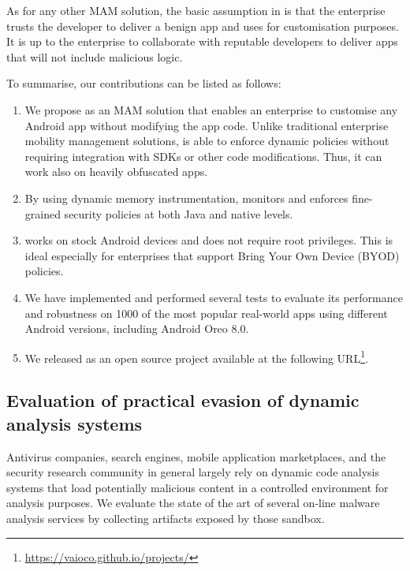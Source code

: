As for any other MAM solution, the basic assumption in \asd is that the enterprise trusts the developer to deliver a benign app and uses \asd for customisation purposes. It is up to the enterprise to collaborate with reputable developers to deliver apps that will not include malicious logic. 

To summarise, our contributions can be listed as follows: 

\begin{enumerate}
\item We propose \asd as an MAM solution that enables an enterprise to customise any Android app without modifying the app code. Unlike traditional enterprise mobility management solutions, \asd is able to enforce dynamic policies without requiring integration with SDKs or other code modifications. Thus, it can work also on heavily obfuscated apps.

\item By using dynamic memory instrumentation, \asd monitors and enforces fine-grained security policies at both Java and native levels.

\item \asd works on stock Android devices and does not require root privileges. This is ideal especially for enterprises that support Bring Your Own Device (BYOD) policies.  

\item We have implemented \asd and performed several tests to evaluate its performance and robustness on 1000 of the most popular real-world apps using  different Android versions, including Android Oreo 8.0. 

\item We released \asd as an open source project available at the following URL\footnote{ \url{https://vaioco.github.io/projects/}}.
\end{enumerate}


\subsection{Evaluation of practical evasion of dynamic analysis systems}

Antivirus companies, search engines, mobile application marketplaces, and the security research community in general largely rely on dynamic code analysis systems that load potentially malicious content in a controlled environment for analysis purposes. We evaluate the state of the art of several on-line malware analysis services by collecting artifacts exposed by those sandbox. 

